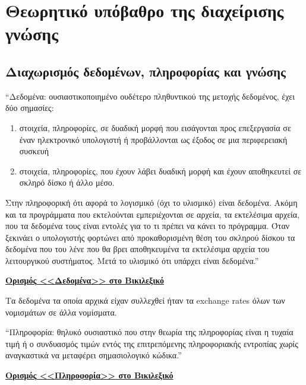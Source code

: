 \label{Chapter2}

\section{Θεωρητικό υπόβαθρο της διαχείρισης γνώσης}

\subsection{Διαχωρισμός δεδομένων, πληροφορίας και γνώσης}

\begin{problem}
  ``Δεδομένα: ουσιαστικοποιημένο ουδέτερο πληθυντικού της μετοχής δεδομένος, έχει δύο σημασίες:

  \begin{enumerate}
    \item στοιχεία, πληροφορίες, σε δυαδική μορφή που εισάγονται προς επεξεργασία σε έναν ηλεκτρονικό υπολογιστή ή προβάλλονται ως έξοδος σε μια περιφερειακή συσκευή
    \item στοιχεία, πληροφορίες, που έχουν λάβει δυαδική μορφή και έχουν αποθηκευτεί σε σκληρό δίσκο ή άλλο μέσο.
  \end{enumerate}

  Στην πληροφορική ότι αφορά το λογισμικό (όχι το υλισμικό) είναι δεδομένα. Ακόμη και τα προγράμματα που εκτελούνται εμπεριέχονται σε αρχεία, τα εκτελέσιμα αρχεία, που τα δεδομένα τους είναι εντολές για το τι πρέπει να κάνει το πρόγραμμα. Όταν ξεκινάει ο υπολογιστής φορτώνει από προκαθορισμένη θέση του σκληρού δίσκου τα δεδομένα που του λένε που θα βρει αποθηκευμένα τα εκτελέσιμα αρχεία του λειτουργικού συστήματος. Μετά το υλισμικό ότι υπάρχει είναι δεδομένα.''

  \href{https://el.wiktionary.org/wiki/%CE%B4%CE%B5%CE%B4%CE%BF%CE%BC%CE%AD%CE%BD%CE%B1}{\textbf{Ορισμός <<Δεδομένα>> στο Βικιλεξικό}}
\end{problem}

Τα δεδομένα τα οποία αρχικά είχαν συλλεχθεί ήταν τα exchange rates όλων των νομισμάτων σε άλλα νομίσματα.

\begin{problem}
  ``Πληροφορία: θηλυκό ουσιαστικό που στην θεωρία της πληροφορίας είναι η τυχαία τιμή ή ο συνδυασμός τιμών εντός της επιτρεπόμενης πληροφοριακής εντροπίας χωρίς αναγκαστικά να μεταφέρει σημασιολογικό κώδικα.''

  \href{https://el.wiktionary.org/wiki/%CF%80%CE%BB%CE%B7%CF%81%CE%BF%CF%86%CE%BF%CF%81%CE%AF%CE%B1}{\textbf{Ορισμός <<Πληροφορία>> στο Βικιλεξικό}}
\end{problem}

